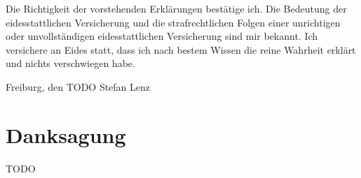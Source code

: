 \documentclass[12pt]{article}
\begin{document}
\begin{appendices}
Die Richtigkeit der vorstehenden Erklärungen bestätige ich. Die Bedeutung der eidesstattlichen Versicherung und die strafrechtlichen Folgen einer unrichtigen oder unvollständigen eidesstattlichen Versicherung sind mir bekannt.
Ich versichere an Eides statt, dass ich nach bestem Wissen die reine Wahrheit erklärt und nichts verschwiegen habe.
\vspace{2cm}

Freiburg, den TODO \hspace{3cm} Stefan Lenz

\clearpage
\section{Danksagung}
TODO


\end{appendices}
\end{document}
